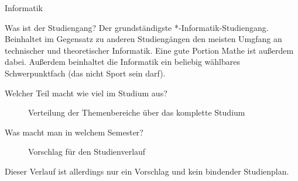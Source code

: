 	\begin{LARGE}
			Informatik
		\end{LARGE}
		\begin{exampleblock}{Was ist der Studiengang?}
			Der grundständigste *-Informatik-Studiengang. Beinhaltet im Gegensatz zu anderen Studiengängen den meisten Umgfang an technischer und theoretischer Informatik. Eine gute Portion Mathe ist außerdem dabei. Außerdem beinhaltet die Informatik ein beliebig wählbares Schwerpunktfach (das nicht Sport sein darf).
		\end{exampleblock}
	
	\begin{block}{Welcher Teil macht wie viel im Studium aus?}
		\begin{figure}[h!]
			\caption{Verteilung der Themenbereiche über das komplette Studium}
		\end{figure}
	\end{block}
	
	\begin{block}{Was macht man in welchem Semester?}
		\begin{figure}[h!]
			\caption{Vorschlag für den Studienverlauf}
		\end{figure}
		Dieser Verlauf ist allerdings nur ein Vorschlag und kein bindender Studienplan.
	\end{block}
